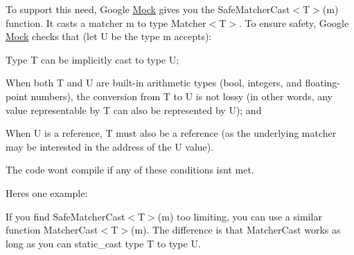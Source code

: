 To support this need, Google \mbox{\hyperlink{class_mock}{Mock}} gives you the {\ttfamily Safe\+Matcher\+Cast$<$T$>$(m)} function. It casts a matcher {\ttfamily m} to type {\ttfamily Matcher$<$T$>$}. To ensure safety, Google \mbox{\hyperlink{class_mock}{Mock}} checks that (let {\ttfamily U} be the type {\ttfamily m} accepts)\+:


\begin{DoxyEnumerate}
\item Type {\ttfamily T} can be implicitly cast to type {\ttfamily U};
\end{DoxyEnumerate}
\begin{DoxyEnumerate}
\item When both {\ttfamily T} and {\ttfamily U} are built-\/in arithmetic types ({\ttfamily bool}, integers, and floating-\/point numbers), the conversion from {\ttfamily T} to {\ttfamily U} is not lossy (in other words, any value representable by {\ttfamily T} can also be represented by {\ttfamily U}); and
\end{DoxyEnumerate}
\begin{DoxyEnumerate}
\item When {\ttfamily U} is a reference, {\ttfamily T} must also be a reference (as the underlying matcher may be interested in the address of the {\ttfamily U} value).
\end{DoxyEnumerate}

The code won\textquotesingle{}t compile if any of these conditions isn\textquotesingle{}t met.

Here\textquotesingle{}s one example\+:


\begin{DoxyCode}{0}
\DoxyCodeLine{}
\DoxyCodeLine{}
\DoxyCodeLine{\};}
\DoxyCodeLine{}
\end{DoxyCode}


If you find {\ttfamily Safe\+Matcher\+Cast$<$T$>$(m)} too limiting, you can use a similar function {\ttfamily Matcher\+Cast$<$T$>$(m)}. The difference is that {\ttfamily Matcher\+Cast} works as long as you can {\ttfamily static\+\_\+cast} type {\ttfamily T} to type {\ttfamily U}.


